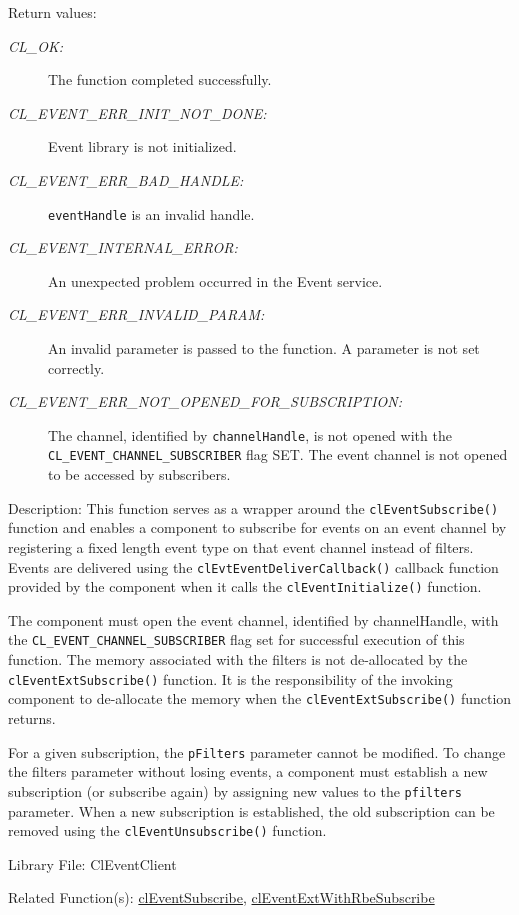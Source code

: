 \begin{flushleft}
\begin{Desc}
\begin{description}
\end{description}
\end{Desc}
\begin{Desc}
\item[Return values:]
\begin{description}
\item[{\em CL\_\-OK:}]The function completed successfully. 
\item[{\em CL\_\-EVENT\_\-ERR\_\-INIT\_\-NOT\_\-DONE:}]Event library is not initialized. 
\item[{\em CL\_\-EVENT\_\-ERR\_\-BAD\_\-HANDLE:}]{\tt{eventHandle}} is an invalid handle.
\item[{\em CL\_\-EVENT\_\-INTERNAL\_\-ERROR:}]An unexpected problem occurred in the Event service. 
\item[{\em CL\_\-EVENT\_\-ERR\_\-INVALID\_\-PARAM:}]An invalid parameter is passed to the function. A parameter is not set correctly.
\item[{\em CL\_\-EVENT\_\-ERR\_\-NOT\_\-OPENED\_\-FOR\_\-SUBSCRIPTION:}]The channel, identified by {\tt{channelHandle}}, is not opened with the
{\tt{CL\_\-EVENT\_\-CHANNEL\_\-SUBSCRIBER}} flag SET. The event channel is not opened to be accessed by subscribers.
\end{description}
\end{Desc}
\begin{Desc}
\item[Description:]
This function serves as a wrapper around the {\tt{clEventSubscribe()}} function and enables a component to subscribe for events on an event channel by 
registering a fixed length event type on that event channel instead of filters. Events are delivered using the 
{\tt{clEvtEventDeliverCallback()}} callback function provided by the component when it calls the {\tt{clEventInitialize()}} function. 
\par
The component must open the event channel, identified by channelHandle, with the {\tt{CL\_\-EVENT\_\-CHANNEL\_\-SUBSCRIBER}} flag set for successful execution 
of this function. The memory associated with the filters is not de-allocated by the {\tt{clEventExtSubscribe()}} function. It is the responsibility of the invoking
component to de-allocate the memory when the {\tt{clEventExtSubscribe()}} function returns.
\par
For a given subscription, the {\tt{pFilters}} parameter cannot be modified. To change the filters parameter without losing events, a component must 
establish a new subscription (or subscribe again) by assigning new values to the {\tt{pfilters}} parameter. When a new subscription is established, the old 
subscription can be removed using the {\tt{clEventUnsubscribe()}} function. 
\end{Desc}
\begin{Desc}
\item[Library File:]Cl\-Event\-Client\end{Desc}
\begin{Desc}
\item[Related Function(s):]\hyperlink{pageem114}{cl\-Event\-Subscribe}, \hyperlink{pageem202}{cl\-Event\-Ext\-With\-Rbe\-Subscribe} \end{Desc}
\newpage



\end{flushleft}
